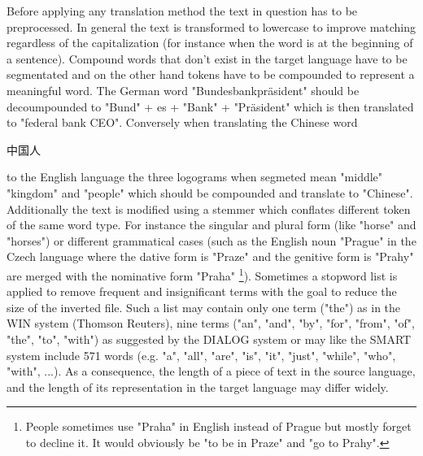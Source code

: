 \documentclass[journal]{IEEEtran}
\begin{document}
Before applying any translation method the text in question has to be preprocessed. In general the text is transformed to lowercase to improve matching regardless of the capitalization (for instance when the word is at the beginning of a sentence). Compound words that don't exist in the target language have to be segmentated and on the other hand tokens have to be compounded to represent a meaningful word. The German word "Bundesbankpr\"{a}sident" should be decoumpounded to "Bund" + es + "Bank" + "Pr\"{a}sident" which is then translated to "federal bank CEO". Conversely when translating the Chinese word \begin{CJK}{UTF8}{gbsn}中国人\end{CJK} to the English language the three logograms when segmeted mean "middle" "kingdom" and "people" which should be compounded and translate to "Chinese".\cite{ir13}
Additionally the text is modified using a stemmer which conflates different token of the same word type. For instance the singular and plural form (like "horse" and "horses") or different grammatical cases (such as the English noun "Prague" in the Czech language where the dative form is "Praze" and the genitive form is "Prahy" are merged with the nominative form "Praha" \footnote{People sometimes use "Praha" in English instead of Prague but mostly forget to decline it. It would obviously be "to be in Praze" and "go to Prahy".}).
Sometimes a stopword list is applied to remove frequent and insignificant terms with the goal to reduce the size of the inverted file. Such a list may contain only one term ("the") as in the WIN system (Thomson Reuters), nine terms ("an", "and", "by", "for", "from", "of", "the", "to", "with") as suggested by the DIALOG system or may like the SMART system include 571 words (e.g. "a", "all", "are", "is", "it", "just", "while", "who", "with", ...).
As a consequence, the length of a piece of text in the source language, and the length of its representation in the target language may differ widely.
\end{document}

